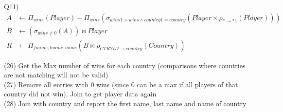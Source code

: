 \documentclass[12pt] {article}
\begin{document}
        Q11)
        \begin{align}
        	A &\leftarrow \Pi_{wins}(Player)- \Pi_{wins}(\sigma_{wins1 > wins \wedge country1 = country}(Player \times \rho_{* \rightarrow *1}(Player)))\\
        	B &\leftarrow (\sigma_{wins \neq 0}(A)) \bowtie Player\\
        	R &\leftarrow  \Pi_{fname, lname, name}(B \bowtie \rho_{CTRYID \rightarrow country}(Country))
        \end{align}
        \begin{flushleft}
      	(26) Get the Max number of wins for each country (comparisons where countries are not matching will not be valid)\\
      	(27) Remove all entries with 0 wins (since 0 can be a max if all players of that country did not win). Join to get player data again\\
      	(28) Join with country and report the first name, last name and name of country
        \end{flushleft}
\end{document}
